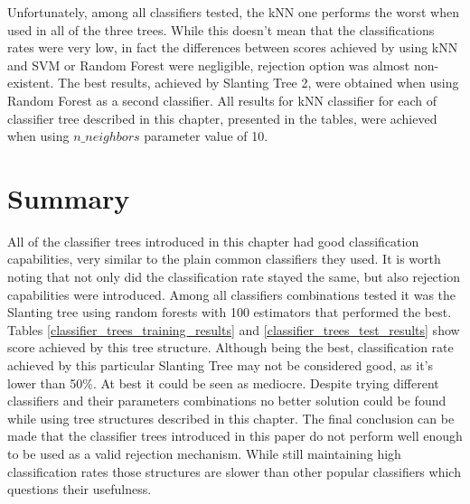 Unfortunately, among all classifiers tested, the kNN one performs the worst when used in all of the three trees. While this doesn't mean that the classifications rates were very low, in fact the differences between scores achieved by using kNN and SVM or Random Forest were negligible, rejection option was almost non-existent. The best results, achieved by Slanting Tree 2, were obtained when using Random Forest as a second classifier. All results for kNN classifier for each of classifier tree described in this chapter, presented in the tables, were achieved when using $n\_neighbors$ parameter value of 10.

\section{Summary}

All of the classifier trees introduced in this chapter had good classification capabilities, very similar to the plain common classifiers they used. It is worth noting that not only did the classification rate stayed the same, but also rejection capabilities were introduced. Among all classifiers combinations tested it was the Slanting tree using random forests with 100 estimators that performed the best. Tables \ref{classifier_trees_training_results} and \ref{classifier_trees_test_results} show score achieved by this tree structure. Although being the best, classification rate achieved by this particular Slanting Tree may not be considered good, as it's lower than 50\%. At best it could be seen as mediocre. Despite trying different classifiers and their parameters combinations no better solution could be found while using tree structures described in this chapter. The final conclusion can be made that the classifier trees introduced in this paper do not perform well enough to be used as a valid rejection mechanism. While still maintaining high classification rates those structures are slower than other popular classifiers which questions their usefulness.